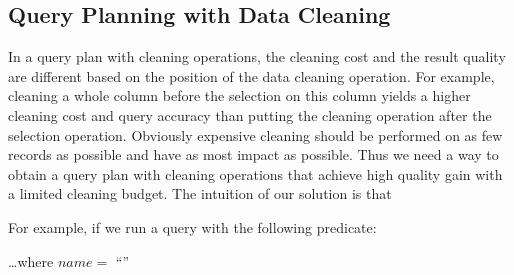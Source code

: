 



\subsection{Query Planning with Data Cleaning}
\label{subsec:gain}


In a query plan with cleaning operations, the cleaning cost and the result quality are different based on the position of the data cleaning operation. For example, cleaning a whole column before the selection on this column yields a higher cleaning cost and query accuracy than putting the cleaning operation after the selection operation. Obviously expensive cleaning should be performed on as few records as possible and have as most impact as possible. 
Thus we need a way to obtain a query plan with cleaning operations that achieve high quality gain with a limited cleaning budget.
The intuition of our solution is that 








\iffalse
For example, if we run a query with the following predicate:

\vspace{.5em}
\dots \textsf{where} $name = $ ``''
\vspace{.5em}



